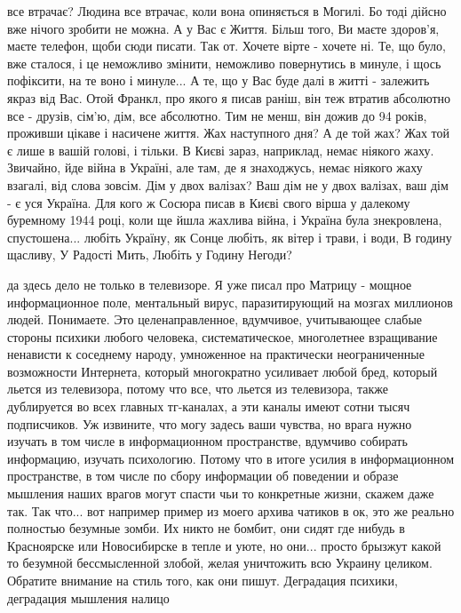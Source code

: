 
все втрачає? Людина все втрачає, коли вона опиняється в Могилі. Бо тоді дійсно
вже нічого зробити не можна. А у Вас є Життя. Більш того, Ви маєте здоров'я,
маєте телефон, щоби сюди писати. Так от. Хочете вірте - хочете ні. Те, що було,
вже сталося, і це неможливо змінити, неможливо повернутись в минуле, і щось
пофіксити, на те воно і минуле... А те, що у Вас буде далі в житті - залежить
якраз від Вас. Отой Франкл, про якого я писав раніш, він теж втратив абсолютно
все - друзів, сім'ю, дім, все абсолютно. Тим не менш, він дожив до 94 років,
проживши цікаве і насичене життя. Жах наступного дня? А де той жах? Жах той є
лише в вашій голові, і тільки. В Києві зараз, наприклад, немає ніякого жаху.
Звичайно, йде війна в Україні, але там, де я знаходжусь, немає ніякого жаху
взагалі, від слова зовсім. Дім у двох валізах? Ваш дім не у двох валізах, ваш
дім - є уся Україна. Для кого ж Сосюра писав в Києві свого вірша у далекому
буремному 1944 році, коли ще йшла жахлива війна, і Україна була знекровлена,
спустошена... любіть Україну, як Сонце любіть, як вітер і трави, і води, В
годину щасливу, У Радості Мить, Любіть у Годину Негоди?

да здесь дело не только в телевизоре. Я уже писал про Матрицу - мощное
информационное поле, ментальный вирус, паразитирующий на мозгах миллионов
людей. Понимаете. Это целенаправленное, вдумчивое, учитывающее слабые стороны
психики любого человека, систематическое, многолетнее взращивание ненависти к
соседнему народу, умноженное на практически неограниченные возможности
Интернета,  который многократно усиливает любой бред, который льется из
телевизора, потому что все, что льется из телевизора, также дублируется во всех
главных тг-каналах, а эти каналы имеют сотни тысяч подписчиков. Уж извините,
что могу задесь ваши чувства, но врага нужно изучать в том числе в
информационном пространстве, вдумчиво собирать информацию, изучать психологию.
Потому что в итоге усилия в информационном пространстве, в том числе по сбору
информации об поведении и образе мышления наших врагов могут спасти чьи то
конкретные жизни, скажем даже так. Так что... вот например пример из моего
архива чатиков в ок, это же реально полностью безумные зомби. Их никто не
бомбит, они сидят где нибудь в Красноярске или Новосибирске в тепле и уюте, но
они... просто брызжут какой то безумной бессмысленной злобой, желая уничтожить
всю Украину целиком. Обратите внимание  на стиль того, как они пишут.
Деградация психики, деградация мышления налицо

